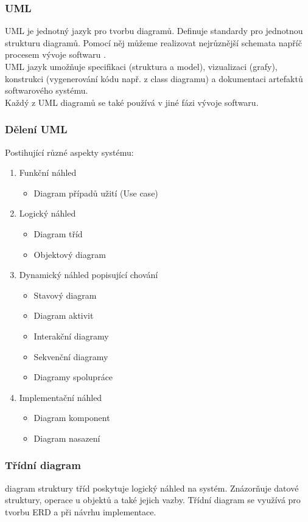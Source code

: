 \documentclass[10pt,a4paper]{article}
\begin{document}
\subsubsection{UML}
UML je jednotný jazyk pro tvorbu diagramů. Definuje standardy pro jednotnou strukturu diagramů. Pomocí něj můžeme realizovat nejrůznější schemata napříč procesem vývoje softwaru .\\
UML jazyk umožňuje specifikaci (struktura a model), vizualizaci (grafy), konstrukci (vygenerování kódu např. z class diagramu) a dokumentaci artefaktů softwarového systému.\\
Každý z UML diagramů se také používá v jiné fázi vývoje softwaru. 
\subsubsection{Dělení UML}
Postihující různé aspekty systému:
\begin{enumerate}
\item Funkční náhled
\begin{itemize}
\item Diagram případů užití (Use case)
\end{itemize}
\item Logický náhled
\begin{itemize}
\item Diagram tříd
\item Objektový diagram
\end{itemize}
\item Dynamický náhled popisující chování
\begin{itemize}
\item Stavový diagram
\item Diagram aktivit
\item Interakční diagramy
\item Sekvenční diagramy
\item Diagramy spolupráce
\end{itemize}
\item Implementační náhled
\begin{itemize}
\item Diagram komponent
\item Diagram nasazení
\end{itemize}
\end{enumerate}

\subsubsection{Třídní diagram}
diagram struktury tříd poskytuje logický náhled na systém. Znázorňuje datové struktury, operace u objektů a také jejich vazby. Třídní diagram se využívá pro tvorbu ERD a při návrhu implementace.
\end{document}
